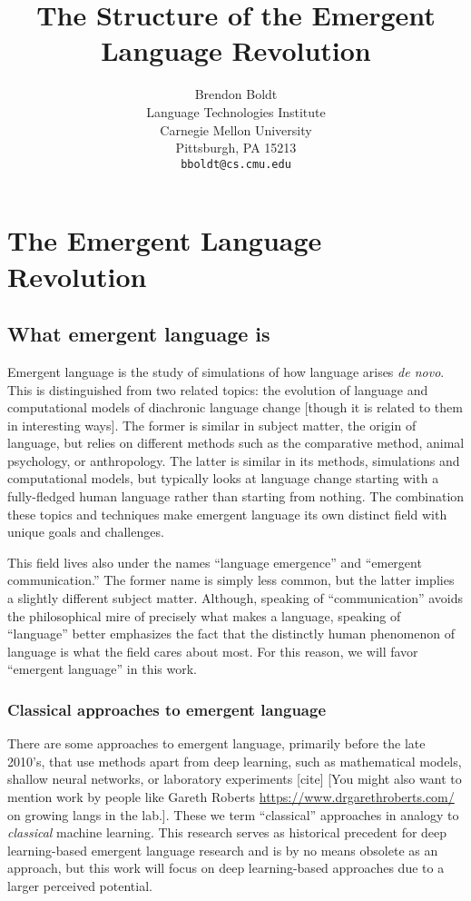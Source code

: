 \documentclass[letterpaper]{report}
\title{The Structure of the Emergent Language Revolution}
\author{%
  Brendon Boldt\\
  Language Technologies Institute\\
  Carnegie Mellon University\\
  Pittsburgh, PA 15213 \\
  \texttt{bboldt@cs.cmu.edu} \\
}
\newcommand\cmg[1]{{\color{gray}[#1]}}
\newcommand\drm[1]{{\color{red}[#1]}}
\begin{document}
\maketitle

\setcounter{tocdepth}{1}
\tableofcontents



\chapter{The Emergent Language Revolution}
\section{What emergent language is}
Emergent language is the study of simulations of how language arises \emph{de novo}.
This is distinguished from two related topics: the evolution of language and computational models of diachronic language change \drm{though it is related to them in interesting ways}.
The former is similar in subject matter, the origin of language, but relies on different methods such as the comparative method, animal psychology, or anthropology.
The latter is similar in its methods, simulations and computational models, but typically looks at language change starting with a fully-fledged human language rather than starting from nothing.
The combination these topics and techniques make emergent language its own distinct field with unique goals and challenges.

This field lives also under the names ``language emergence'' and ``emergent communication.''
The former name is simply less common, but the latter implies a slightly different subject matter.
Although, speaking of ``communication'' avoids the philosophical mire of precisely what makes a language, speaking of ``language'' better emphasizes the fact that the distinctly human phenomenon of language is what the field cares about most.
For this reason, we will favor ``emergent language'' in this work.

\subsection{Classical approaches to emergent language}
There are some approaches to emergent language, primarily before the late 2010's, that use methods apart from deep learning, such as mathematical models, shallow neural networks, or laboratory experiments \cmg{cite} \drm{You might also want to mention work by people like Gareth Roberts \url{https://www.drgarethroberts.com/} on growing langs in the lab.}.
These we term ``classical'' approaches in analogy to \emph{classical} machine learning.
This research serves as historical precedent for deep learning-based emergent language research and is by no means obsolete as an approach, but this work will focus on deep learning-based approaches due to a larger perceived potential.
\end{document}
